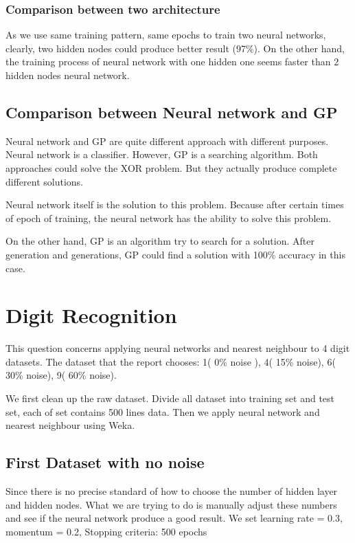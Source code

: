 \documentclass[11pt, a4paper, oneside, openright]{article}
\begin{document}
\subsubsection{Comparison between two architecture}
As we use same training pattern, same epochs to train two neural networks, clearly, two hidden nodes could produce better result (97\%). On the other hand, the training process of neural network with one hidden one seems faster than 2 hidden nodes neural network.


\subsection{Comparison between Neural network and GP}
Neural network and GP are quite different approach with different purposes. Neural network is a classifier. However, GP is a searching algorithm. Both approaches could solve the XOR problem. But they actually produce complete different solutions. 

Neural network itself is the solution to this problem. Because after certain times of epoch of training, the neural network has the ability to solve this problem.

On the other hand, GP is an algorithm try to search for a solution. After generation and generations, GP could find a solution with 100\% accuracy in this case.   


\section{Digit Recognition}
This question concerns applying neural networks and nearest neighbour to 4 digit datasets. The dataset that the report chooses: 1( 0\% noise ), 4( 15\% noise), 6( 30\% noise), 9( 60\% noise).

We first clean up the raw dataset. Divide all dataset into training set and test set, each  of set contains 500 lines data.
Then we apply neural network and nearest neighbour using Weka.
\subsection{First Dataset with no noise}
Since there is no precise standard of how to choose the number of hidden layer and hidden nodes. What we are trying to do is manually adjust these numbers and see if the neural network produce a good result. We set learning rate = 0.3, momentum = 0.2, Stopping criteria: 500 epochs
\end{document}
